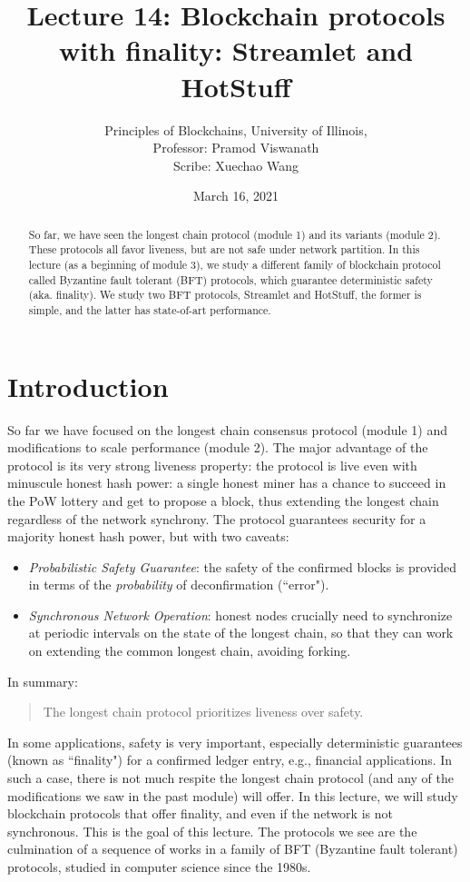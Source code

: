 \documentclass{article}
\title{Lecture 14: Blockchain protocols with finality: Streamlet and HotStuff}
\author{Principles of Blockchains, University of Illinois,  \\ Professor:  Pramod Viswanath \\ Scribe:  Xuechao Wang}
\date{March 16, 2021}
\begin{document}
\maketitle

\begin{abstract}
So far, we have seen the longest chain protocol (module 1) and its variants (module 2). These protocols all favor liveness, but are not safe under network partition. In this lecture (as a beginning of module 3), we study a different family of blockchain protocol called Byzantine fault tolerant (BFT) protocols, which guarantee deterministic safety (aka. finality). We study two BFT protocols, Streamlet and HotStuff, the former is simple, and the latter has state-of-art performance.
\end{abstract}

\section*{Introduction}

So far we have focused on the longest chain consensus protocol (module 1) and modifications to scale performance (module 2). The major advantage of the protocol is its very strong liveness property: the protocol is live even with minuscule honest hash power:  a single honest miner has a chance to succeed in the PoW lottery and get to propose a block, thus extending the longest chain regardless of the network synchrony. The protocol guarantees  security  for a majority honest hash power, but with two caveats: 
\begin{itemize}
    \item {\em Probabilistic Safety Guarantee}: the safety of the confirmed blocks is provided in terms of the {\em probability} of deconfirmation (``error").  
    \item {\em Synchronous Network Operation}: honest nodes crucially need to synchronize at periodic intervals on the state of the longest chain, so that they can work on extending the common longest chain, avoiding forking. 
\end{itemize}
In summary:
\begin{quote}
    The longest chain protocol prioritizes liveness over  safety.
\end{quote} 
In some applications, safety is very important, especially deterministic guarantees (known as ``finality") for a confirmed ledger entry,  e.g., financial applications. In such a case, there is not much respite the longest chain protocol (and any of the modifications we saw in the past module) will offer. In this lecture, we will study  blockchain protocols that offer finality, and even if the network is not synchronous. This is the goal of this lecture.  The protocols we see are the culmination of a sequence of works in a family of  BFT (Byzantine fault tolerant) protocols, studied in computer science since the 1980s.  
\end{document}
